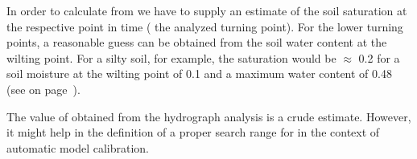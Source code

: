In order to calculate \facBase{} from  we have to supply an estimate of the soil saturation \relSat{} at the respective point in time (\ie{} the analyzed turning point). For the lower turning points, a reasonable guess can be obtained from the soil water content at the wilting point. For a silty soil, for example, the saturation \relSat{} would be $\approx$ 0.2 for a soil moisture at the wilting point of 0.1 and a maximum water content of 0.48 (see  on page~\pageref{tab:eta:soilmoisture}).

The value of \facBase{} obtained from the hydrograph analysis is a crude estimate. However, it might help in the definition of a proper search range for \facBase{} in the context of automatic model calibration.
